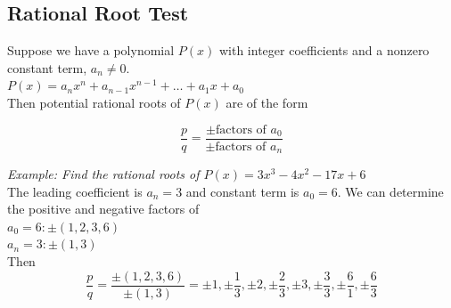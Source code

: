         \begin{center}
        \end{center}



    \subsection{Rational Root Test}
        Suppose we have a polynomial $P(x)$ with integer coefficients and a nonzero constant
        term, $a_n\not=0$. \\
        $P(x)=a_nx^n+a_{n-1}x^{n-1}+\dots+a_1x+a_0$ \\
        Then potential rational roots of $P(x)$ are of the form

        \begin{equation*}
            \frac{p}{q} = \frac{\pm\text{factors of }a_0}{\pm\text{factors of }a_n}
        \end{equation*}

        \noindent \color{blue} \textit{Example: Find the rational roots of
        $P(x)=3x^3-4x^2-17x+6$} \color{black} \\

        \noindent The leading coefficient is $a_n=3$ and constant term is $a_0=6$.
        We can determine the positive and negative factors of \\
        $a_0=6:\pm(1,2,3,6)$ \\
        $a_n=3:\pm(1,3)$ \\
        Then \\

        \begin{equation*}
            \frac{p}{q} = \frac{\pm(1,2,3,6)}{\pm(1,3)} = \pm 1, \pm\frac{1}{3}, \pm 2,
            \pm \frac{2}{3}, \pm 3, \pm \frac{3}{3}, \pm \frac{6}{1}, \pm \frac{6}{3}
        \end{equation*}

